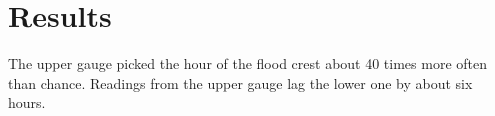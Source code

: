 \section{Results}
The upper gauge picked the hour of the flood crest about 40 times more often than chance. Readings from the upper gauge lag the lower one by about six hours.
